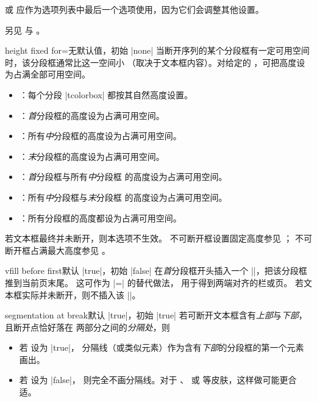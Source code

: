 \begin{marker}
 或 
应作为选项列表中最后一个选项使用，因为它们会调整其他设置。
\end{marker}


\begin{marker}
另见 
与 。
\end{marker}


\begin{docTcbKey}{height fixed for}{=}{无默认值，初始 |none|}
  当断开序列的某个分段框有一定可用空间时，该分段框通常比这一空间小
  （取决于文本框内容）。对给定的 ，可把高度设为占满全部可用空间。
  \begin{itemize}
  \item{}：每个分段 |tcolorbox| 都按其自然高度设置。
  \item{}：\emph{首}分段框的高度设为占满可用空间。
  \item{}：所有\emph{中}分段框的高度设为占满可用空间。
  \item{}：\emph{末}分段框的高度设为占满可用空间。
  \item{}：\emph{首}分段框与所有\emph{中}分段框
    的高度设为占满可用空间。
  \item{}：所有\emph{中}分段框与\emph{末}分段框
    的高度设为占满可用空间。
  \item{}：所有分段框的高度都设为占满可用空间。
  \end{itemize}
\begin{marker}
  若文本框最终并未断开，则本选项不生效。
  不可断开框设置固定高度参见 ；
  不可断开框占满最大高度参见 。
\end{marker}
\end{docTcbKey}


\begin{docTcbKey}{vfill before first}{}{默认 |true|，初始 |false|}
  在\emph{首}分段框开头插入一个 |\vfill|，把该分段框推到当前页末尾。
  这可作为 |=| 的替代做法，
  用于得到两端对齐的栏或页。
  若文本框实际并未断开，则不插入该 |\vfill|。
\end{docTcbKey}


\begin{docTcbKey}[][doc new=2017-03-20]{segmentation at break}{}{默认 |true|，初始 |true|}
  若可断开文本框含有\emph{上部}与\emph{下部}，且断开点恰好落在
  两部分之间的\emph{分隔处}，则
  \begin{itemize}
  \item 若  设为 |true|，
    分隔线（或类似元素）作为含有\emph{下部}的分段框的第一个元素画出。
  \item 若  设为 |false|，
    则完全不画分隔线。对于 、
    或  等皮肤，这样做可能更合适。
  \end{itemize}
\end{docTcbKey}


